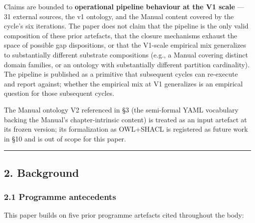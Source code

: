 \documentclass[
]{article}
\begin{document}
Claims are bounded to \textbf{operational pipeline behaviour at the V1
scale} --- 31 external sources, the v1 ontology, and the Manual content
covered by the cycle's six iterations. The paper does not claim that the
pipeline is the only valid composition of these prior artefacts, that
the closure mechanisms exhaust the space of possible gap dispositions,
or that the V1-scale empirical mix generalizes to substantially
different substrate compositions (e.g., a Manual covering distinct
domain families, or an ontology with substantially different partition
cardinality). The pipeline is published as a primitive that subsequent
cycles can re-execute and report against; whether the empirical mix at
V1 generalizes is an empirical question for those subsequent cycles.

The Manual ontology V2 referenced in §3 (the semi-formal YAML vocabulary
backing the Manual's chapter-intrinsic content) is treated as an input
artefact at its frozen version; its formalization as OWL+SHACL is
registered as future work in §10 and is out of scope for this paper.

\begin{center}\rule{0.5\linewidth}{0.5pt}\end{center}

\subsection{2. Background}\label{background}

\subsubsection{2.1 Programme antecedents}\label{programme-antecedents}

This paper builds on five prior programme artefacts cited throughout the
body:
\end{document}
